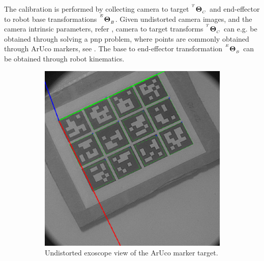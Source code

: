 The calibration is performed by collecting camera to target ${}^{^T}\mathbf{\Theta}_{_C}$ and end-effector to robot base transformations ${}^{^E}\mathbf{\Theta}_{_B}$. Given undistorted camera images, and the camera intrinsic parameters, refer , camera to target transforms ${}^{^T}\mathbf{\Theta}_{_C}$ can e.g. be obtained through solving a \gls{pnp} problem, where points are commonly obtained through ArUco markers, see . The base to end-effector transformation ${}^{^E}\mathbf{\Theta}_{_B}$ can be obtained through robot kinematics.
\begin{figure}[htb]
    \centering
    \begin{subfigure}[b]{0.49\textwidth}
        \centering
        \includegraphics[width=\textwidth]{introduction/img/aruco.png}
        \caption{Undistorted exoscope view of the ArUco marker target.}
    \end{subfigure}
    \begin{subfigure}[b]{0.49\textwidth}
        \centering

\end{subfigure}
\end{figure}
